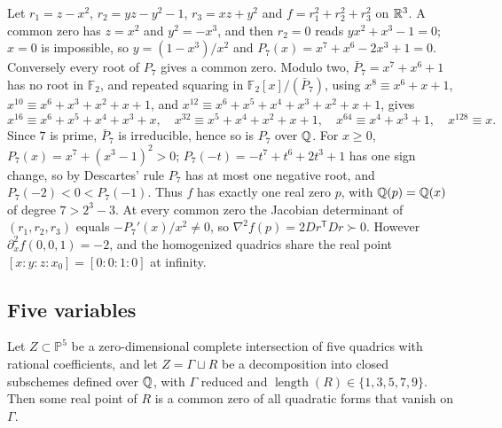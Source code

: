 \begin{example}
\label{ex:algebraic-seven}
Let $r_1=z-x^2$, $r_2=yz-y^2-1$, $r_3=xz+y^2$ and $f=r_1^2+r_2^2+r_3^2$ on
$\mathbb R^3$. A common zero has $z=x^2$ and $y^2=-x^3$, and then $r_2=0$ reads
$yx^2+x^3-1=0$; $x=0$ is impossible, so $y=(1-x^3)/x^2$ and
$P_7(x)=x^7+x^6-2x^3+1=0$. Conversely every root of $P_7$ gives a common zero.
Modulo two, $\bar P_7=x^7+x^6+1$ has no root in $\mathbb F_2$, and repeated
squaring in $\mathbb F_2[x]/(\bar P_7)$, using
$x^8\equiv x^6+x+1$, $x^{10}\equiv x^6+x^3+x^2+x+1$, and
$x^{12}\equiv x^6+x^5+x^4+x^3+x^2+x+1$, gives
\[
 x^{16}\equiv x^6+x^5+x^4+x^3+x,\quad
 x^{32}\equiv x^5+x^4+x^2+x+1,\quad
 x^{64}\equiv x^4+x^3+1,\quad
 x^{128}\equiv x .
\]
Since $7$ is prime, $\bar P_7$ is irreducible, hence so is $P_7$ over $\mathbb Q$.
For $x\ge0$, $P_7(x)=x^7+(x^3-1)^2>0$; $P_7(-t)=-t^7+t^6+2t^3+1$ has one sign
change, so by Descartes' rule $P_7$ has at most one negative root, and
$P_7(-2)<0<P_7(-1)$. Thus $f$ has exactly one real zero $p$, with
$\mathbb Q(p)=\mathbb Q(x)$ of degree $7>2^3-3$. At every common zero the Jacobian
determinant of $(r_1,r_2,r_3)$ equals $-P_7'(x)/x^2\ne0$, so
$\nabla^2f(p)=2Dr^{\mathsf T}Dr\succ0$. However
$\partial_x^2f(0,0,1)=-2$, and the homogenized quadrics share the real point
$[x:y:z:x_0]=[0:0:1:0]$ at infinity.
\end{example}

\subsection{Five variables}
\label{app:algebraic-five}

\begin{proposition}
\label{prop:algebraic-residual}
Let $Z\subset\mathbb P^5$ be a zero-dimensional complete intersection of five
quadrics with rational coefficients, and let $Z=\Gamma\sqcup R$ be a
decomposition into closed subschemes defined over $\mathbb Q$, with $\Gamma$ reduced
and $\operatorname{length}(R)\in\{1,3,5,7,9\}$. Then some real point of $R$ is
a common zero of all quadratic forms that vanish on $\Gamma$.
\end{proposition}

